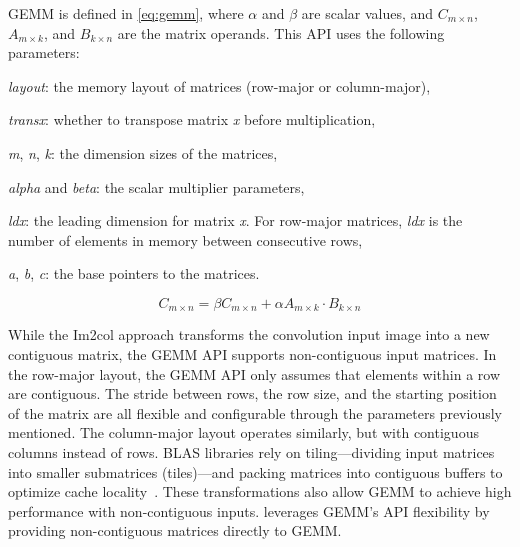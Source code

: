GEMM is defined in \eqref{eq:gemm}, where $\alpha$ and $\beta$ are scalar values, and $C_{m \times n}$, $A_{m \times k}$, and $B_{k \times n}$ are the matrix operands.
This API uses the following parameters:
\begin{enumerate*}[label=(\roman*)] 
    \item \emph{layout}: the memory layout of matrices (row-major or column-major), 
    \item \emph{trans{x}}: whether to transpose matrix \emph{x} before multiplication, 
    \item \emph{m}, \emph{n}, \emph{k}: the dimension sizes of the matrices,
    \item \emph{alpha} and \emph{beta}: the scalar multiplier parameters,
    \item \emph{ld{x}}: the leading dimension for matrix \emph{x}.
    For row-major matrices, \emph{ld{x}} is the number of elements in memory between consecutive rows,
    \item \emph{a}, \emph{b}, \emph{c}: the base pointers to the matrices.
\end{enumerate*}

\begin{equation}
    \label{eq:gemm}
    C_{m \times n} = \beta C_{m \times n} + \alpha A_{m \times k} \cdot B_{k \times n}
\end{equation}

While the Im2col approach transforms the convolution input image into a new contiguous matrix, the GEMM API supports non-contiguous input matrices.
In the row-major layout, the GEMM API only assumes that elements within a row are contiguous.
The stride between rows, the row size, and the starting position of the matrix are all flexible and configurable through the parameters previously mentioned.
The column-major layout operates similarly, but with contiguous columns instead of rows.
BLAS libraries rely on tiling—dividing input matrices into smaller submatrices (tiles)—and packing matrices into contiguous buffers to optimize cache locality~\cite{Goto2008,Rohwedder2023}.
These transformations also allow GEMM to achieve high performance with non-contiguous inputs.
\algname leverages GEMM's API flexibility by providing non-contiguous matrices directly to GEMM.